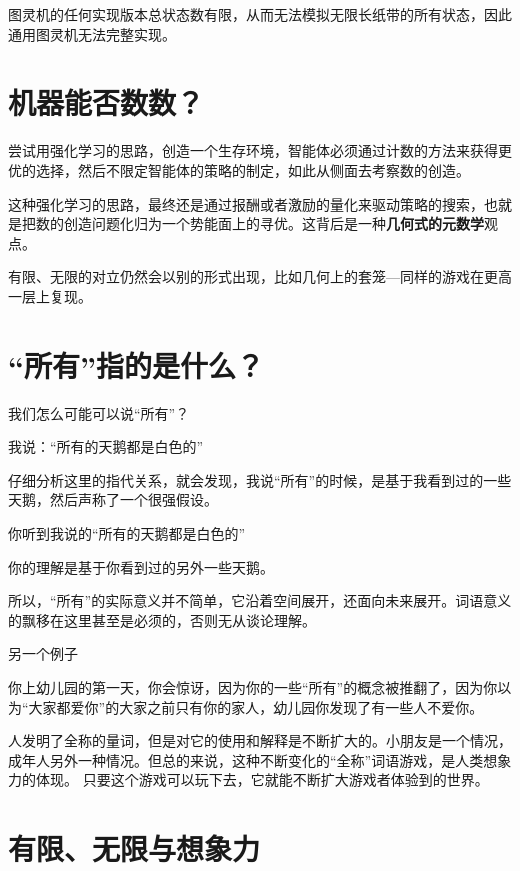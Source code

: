\documentclass[a4paper,12pt]{article}
\numberwithin{problem}{section}
\numberwithin{definition}{section}
\numberwithin{lemma}{section}
\numberwithin{proposition}{section}
\numberwithin{theorem}{section}
\numberwithin{grammar}{section}
\numberwithin{program}{section}
\numberwithin{convention}{section}
\numberwithin{corollary}{section}
\begin{document}
图灵机的任何实现版本总状态数有限，从而无法模拟无限长纸带的所有状态，因此通用图灵机无法完整实现。

\section{机器能否数数？}

尝试用强化学习的思路，创造一个生存环境，智能体必须通过计数的方法来获得更优的选择，然后不限定智能体的策略的制定，如此从侧面去考察数的创造。

这种强化学习的思路，最终还是通过报酬或者激励的量化来驱动策略的搜索，也就是把数的创造问题化归为一个势能面上的寻优。这背后是一种\textbf{几何式的元数学}观点。

有限、无限的对立仍然会以别的形式出现，比如几何上的套笼—同样的游戏在更高一层上复现。

\section{“所有”指的是什么？}

我们怎么可能可以说“所有”？

\begin{displayquote}
我说：“所有的天鹅都是白色的”
\end{displayquote}

仔细分析这里的指代关系，就会发现，我说“所有”的时候，是基于我看到过的一些天鹅，然后声称了一个很强假设。

\begin{displayquote}
你听到我说的“所有的天鹅都是白色的”
\end{displayquote}

你的理解是基于你看到过的另外一些天鹅。

所以，“所有”的实际意义并不简单，它沿着空间展开，还面向未来展开。词语意义的飘移在这里甚至是必须的，否则无从谈论理解。

另一个例子
\begin{displayquote}
你上幼儿园的第一天，你会惊讶，因为你的一些“所有”的概念被推翻了，因为你以为“大家都爱你”的大家之前只有你的家人，幼儿园你发现了有一些人不爱你。
\end{displayquote}

人发明了全称的量词，但是对它的使用和解释是不断扩大的。小朋友是一个情况，成年人另外一种情况。但总的来说，这种不断变化的“全称”词语游戏，是人类想象力的体现。
只要这个游戏可以玩下去，它就能不断扩大游戏者体验到的世界。

\section{有限、无限与想象力}
\end{document}
